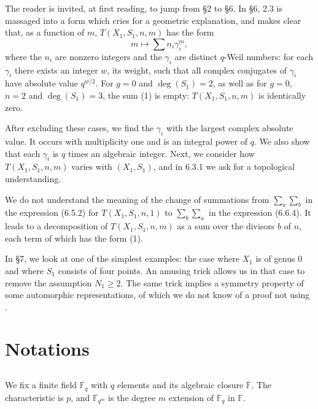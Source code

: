 \documentclass[11pt,a4paper]{article}
\theoremstyle{plain}
\theoremstyle{definition}
\newcommand{\Fq}{\mathbb{F}_q}
\newcommand{\F}{\mathbb{F}}
\begin{document}
The reader is invited, at first reading, to jump from \S 2 to \S 6. In \S 6, 2.3 is massaged into a form which cries for a geometric explanation, and makes clear that, as a function of $m$, $T(X_1,S_1,n,m)$ has the form
\begin{equation}
m \mapsto \sum n_i \gamma_i^m, \tag{1}
\end{equation}
where the $n_i$ are nonzero integers and the $\gamma_i$ are distinct $q$-Weil numbers: for each $\gamma_i$ there exists an integer $w$, its weight, such that all complex conjugates of $\gamma_i$ have absolute value $q^{w/2}$. For $g=0$ and $\deg(S_1)=2$, as well as for $g=0$, $n=2$ and $\deg(S_1)=3$, the sum (1) is empty: $T(X_1,S_1,n,m)$ is identically zero.

After excluding these cases, we find the $\gamma_i$ with the largest complex absolute value. It occurs with multiplicity one and is an integral power of $q$. We also show that each $\gamma_i$ is $q$ times an algebraic integer. Next, we consider how $T(X_1,S_1,n,m)$ varies with $(X_1,S_1)$, and in 6.3.1 we ask for a topological understanding.

We do not understand the meaning of the change of summations from $\sum_a \sum_b$ in the expression (6.5.2) for $T(X_1,S_1,n,1)$ to $\sum_b \sum_a$ in the expression (6.6.4). It leads to a decomposition of $T(X_1,S_1,n,m)$ as a sum over the divisors $b$ of $n$, each term of which has the form (1).

In \S 7, we look at one of the simplest examples: the case where $X_1$ is of genus $0$ and where $S_1$ consists of four points. An amusing trick allows us in that case to remove the assumption $N_1 \geq 2$. The same trick implies a symmetry property of some automorphic representations, of which we do not know of a proof not using \cite{L}.

\section{Notations}

\subsection{}
We fix a finite field $\Fq$ with $q$ elements and its algebraic closure $\F$. The characteristic is $p$, and $\F_{q^m}$ is the degree $m$ extension of $\Fq$ in $\F$.
\end{document}
